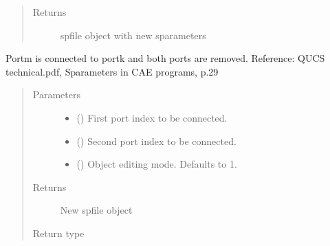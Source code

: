 \documentclass[letterpaper,10pt,english]{sphinxmanual}
\begin{document}
\begin{fulllineitems}
\begin{fulllineitems}
\begin{quote}
\begin{description}
\begin{itemize}
\end{itemize}

\item[{Returns}] \leavevmode
spfile object with new s\sphinxhyphen{}parameters

\end{description}\end{quote}

\end{fulllineitems}


\begin{fulllineitems}
\label{\detokenize{touchstone:touchstone.spfile.connect_2_ports}}
Port\sphinxhyphen{}m is connected to port\sphinxhyphen{}k and both ports are removed.
Reference: QUCS technical.pdf, S\sphinxhyphen{}parameters in CAE programs, p.29
\begin{quote}\begin{description}
\item[{Parameters}] \leavevmode\begin{itemize}
\item {} 
 () \textendash{} First port index to be connected.

\item {} 
 () \textendash{} Second port index to be connected.

\item {} 
 (\sphinxstyleliteralemphasis{\sphinxupquote{, }}) \textendash{} Object editing mode. Defaults to \sphinxhyphen{}1.

\end{itemize}

\item[{Returns}] \leavevmode
New spfile object

\item[{Return type}] \leavevmode
{\hyperref[\detokenize{touchstone:touchstone.spfile}]{}}


\end{description}
\end{quote}
\end{fulllineitems}
\end{fulllineitems}
\end{document}
